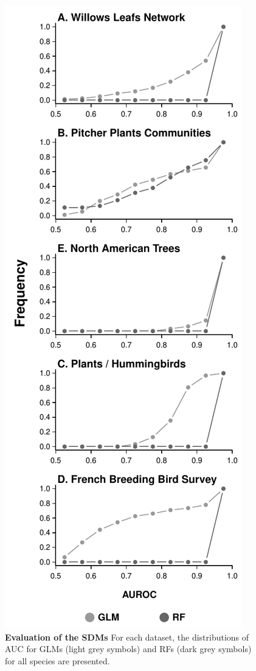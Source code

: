 \newpage

\begin{figure}
\centering
\includegraphics{chapitre3/figS3.pdf}
\caption{\textbf{Evaluation of the SDMs} For each dataset, the
distributions of AUC for GLMs (light grey symbols) and RFs (dark grey
symbols) for all species are presented.\label{fig:auc}}
\end{figure}

